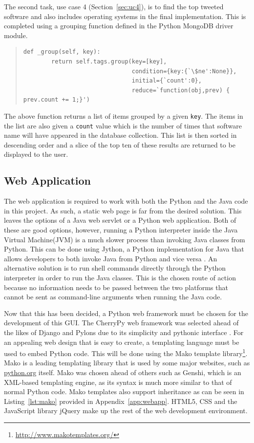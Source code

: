 The second task, use case 4 (Section~\ref{sec:uc4}), is to find the top tweeted software and also includes operating systems in the final implementation. This is completed using a grouping function defined in the Python MongoDB driver module.

\begin{quote}
\begin{lstlisting}
def _group(self, key):
        return self.tags.group(key=[key],
                               condition={key:{`\$ne':None}},
                               initial={`count':0},
                               reduce=`function(obj,prev) { prev.count += 1;}')
\end{lstlisting}
\end{quote}

The above function returns a list of items grouped by a given \texttt{key}. The items in the list are also given a \texttt{count} value which is the number of times that software name will have appeared in the database collection. This list is then sorted in descending order and a slice of the top ten of these results are returned to be displayed to the user.

\subsection{Web Application}
\label{sec:webapp}
The web application is required to work with both the Python and the Java code in this project. As such, a static web page is far from the desired solution. This leaves the options of a Java web servlet or a Python web application. Both of these are good options, however, running a Python interpreter inside the Java Virtual Machine(JVM) is a much slower process than invoking Java classes from Python. This can be done using Jython, a Python implementation for Java that allows developers to both invoke Java from Python and vice versa \cite{Juneau:2010}. An alternative solution is to run shell commands directly through the Python interpreter in order to run the Java classes. This is the chosen route of action because no information needs to be passed between the two platforms that cannot be sent as command-line arguments when running the Java code.

Now that this has been decided, a Python web framework must be chosen for the development of this GUI. The CherryPy web framework was selected ahead of the likes of Django and Pylons due to its simplicity and pythonic interface \cite{cherrypy}. For an appealing web design that is easy to create, a templating language must be used to embed Python code. This will be done using the Mako template library\footnote{\url{http://www.makotemplates.org/}}. Mako is a leading templating library that is used by some major websites, such as \url{python.org} itself. Mako was chosen ahead of others such as Genshi, which is an XML-based templating engine, as its syntax is much more similar to that of normal Python code. Mako templates also support inheritance as can be seen in Listing~\ref{lst:mako} provided in Appendix~\ref{app:webapp}. HTML5, CSS and the JavaScript library jQuery make up the rest of the web development environment.

